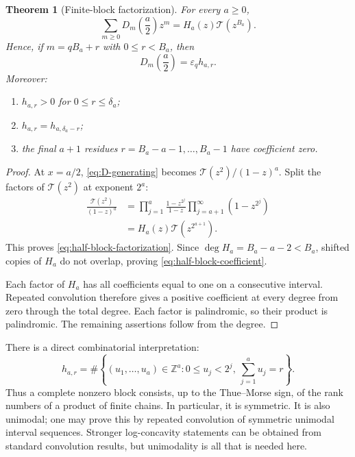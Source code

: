 \documentclass[11pt,oneside]{article}
\newtheorem{theorem}{Theorem}[section]
\theoremstyle{definition}
\theoremstyle{remark}
\newcommand{\Z}{\mathbb Z}
\newcommand{\eps}{\varepsilon}
\newcommand{\Diag}{D}
\newcommand{\TM}{\mathcal T}
\begin{document}
\begin{theorem}[Finite-block factorization]
\label{thm:half-block}
For every $a\ge0$,
\begin{equation}
 \sum_{m\ge0}\Diag_m\!\left(\frac a2\right)z^m
 =H_a(z)\TM(z^{B_a}).
 \label{eq:half-block-factorization}
\end{equation}
Hence, if $m=qB_a+r$ with $0\le r<B_a$, then
\begin{equation}
 \Diag_m\!\left(\frac a2\right)=\eps_qh_{a,r}.
 \label{eq:half-block-coefficient}
\end{equation}
Moreover:
\begin{enumerate}
 \item $h_{a,r}>0$ for $0\le r\le\delta_a$;
 \item $h_{a,r}=h_{a,\delta_a-r}$;
 \item the final $a+1$ residues $r=B_a-a-1,\ldots,B_a-1$ have coefficient
       zero.
\end{enumerate}
\end{theorem}

\begin{proof}
At $x=a/2$, \eqref{eq:D-generating} becomes
$\TM(z^2)/(1-z)^a$.  Split the factors of $\TM(z^2)$ at exponent
$2^a$:
\begin{align*}
 \frac{\TM(z^2)}{(1-z)^a}
 &=\prod_{j=1}^{a}\frac{1-z^{2^j}}{1-z}
   \prod_{j=a+1}^{\infty}(1-z^{2^j})\\
 &=H_a(z)\TM(z^{2^{a+1}}).
\end{align*}
This proves \eqref{eq:half-block-factorization}.  Since
$\deg H_a=B_a-a-2<B_a$, shifted copies of $H_a$ do not overlap, proving
\eqref{eq:half-block-coefficient}.

Each factor of $H_a$ has all coefficients equal to one on a consecutive
interval.  Repeated convolution therefore gives a positive coefficient at
every degree from zero through the total degree.  Each factor is palindromic,
so their product is palindromic.  The remaining assertions follow from the
degree.
\end{proof}

There is a direct combinatorial interpretation:
\begin{equation}
 h_{a,r}
 =\#\left\{(u_1,\ldots,u_a)\in\Z^a:
    0\le u_j<2^j,\ \sum_{j=1}^{a}u_j=r\right\}.
 \label{eq:restricted-compositions}
\end{equation}
Thus a complete nonzero block consists, up to the Thue--Morse sign, of the
rank numbers of a product of finite chains.  In particular, it is symmetric.
It is also unimodal; one may prove this by repeated convolution of symmetric
unimodal interval sequences.  Stronger log-concavity statements can be
obtained from standard convolution results, but unimodality is all that is
needed here.
\end{document}
